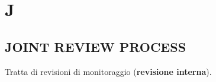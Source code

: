 \newpage
	\flushright{\hyperref[index]{\color{black!65}{Ritorna all'indice}}}\flushleft
	\section{J} \label{sec:J}
	
		\subsection{JOINT REVIEW PROCESS}  \label{joint}
		Tratta di revisioni di monitoraggio (\textbf{revisione interna}).
	
	
